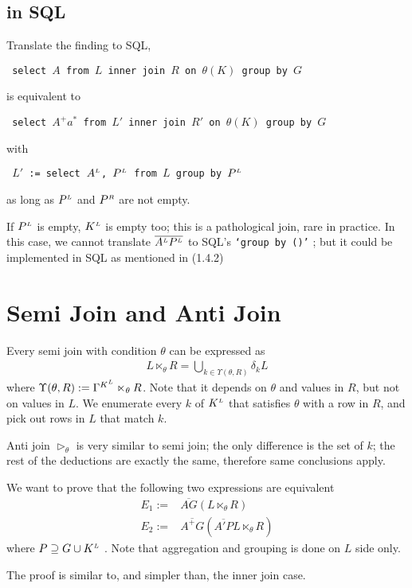 \documentclass[article]{article}
\newcommand{\U}{\bigcup}
\newcommand{\ag}[1]{\overline{#1}}
\newcommand{\LL}{^\mathsmaller{\mathsmaller L}}
\newcommand{\RR}{^\mathsmaller{\mathsmaller R}}
\begin{document}
\subsection{in SQL}

Translate the finding to SQL, 

\texttt{ select $A$ from $L$ inner join $R$ on $\theta(K)$ group by $G$}

is equivalent to

\texttt{ select $A^+ a^*$ from $L'$ inner join $R'$ on $\theta(K)$ group by $G$}

with 

\texttt{ $L'$ := select $A\LL$, $P\LL$ from $L$ group by $P\LL$ }

as long as $P\LL$ and $P\RR$ are not empty.

If $P\LL$ is empty, $K\LL$ is empty too; this is a pathological join, rare in practice.
In this case, we cannot translate $\ag{A\LL P\LL}$  to SQL's {\tt `group by ()'} ; 
but it could be implemented in SQL as mentioned in (1.4.2) 

\section{ Semi Join and Anti Join }

Every semi join with condition $\theta$ can be expressed as 
\begin{align}
L  \ltimes _\theta R = \U_{k \in \Upsilon(\theta, R)} \delta_{k} L  
\end{align}
where $\Upsilon(\theta, R) := \Gamma^{K\LL} \ltimes_\theta R$. 
Note that it depends on $\theta$ and values in $R$, but not on values in $L$.
We enumerate every $k$ of $K\LL$ that satisfies $\theta$ with a row in $R$, and pick out rows
in $L$ that match $k$. 

Anti join $\rhd_\theta$ is very similar to semi join; the only difference is the set of $k$;
the rest of the deductions are exactly the same, 
therefore same conclusions apply.


We want to prove that the following two expressions are equivalent
\begin{align}
E_1 :=& \ag{A G} (L \ltimes_\theta R)  \\
E_2 :=& \ag{A^+ G} (\ag{ A' P} L \ltimes_\theta R)
\end{align}
where $P \supseteq G \cup K\LL $ .
Note that aggregation and grouping is done on $L$ side only.

The proof is similar to, and simpler than, the inner join case.
\end{document}
